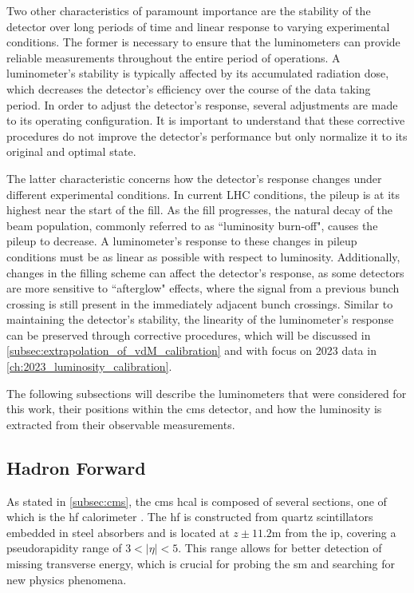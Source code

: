 Two other characteristics of paramount importance are the stability of the detector over long periods of time and linear response to varying experimental conditions. The former is necessary to ensure that the luminometers can provide reliable measurements throughout the entire period of operations. A luminometer’s stability is typically affected by its accumulated radiation dose, which decreases the detector’s efficiency over the course of the data taking period. In order to adjust the detector’s response, several adjustments are made to its operating configuration. It is important to understand that these corrective procedures do not improve the detector's performance but only normalize it to its original and optimal state.

The latter characteristic concerns how the detector’s response changes under different experimental conditions. In current LHC conditions, the pileup is at its highest near the start of the fill. As the fill progresses, the natural decay of the beam population, commonly referred to as ``luminosity burn-off", causes the pileup to decrease. A luminometer’s response to these changes in pileup conditions must be as linear as possible with respect to luminosity. Additionally, changes in the filling scheme can affect the detector’s response, as some detectors are more sensitive to ``afterglow" effects, where the signal from a previous bunch crossing is still present in the immediately adjacent bunch crossings. Similar to maintaining the detector's stability, the linearity of the luminometer’s response can be preserved through corrective procedures, which will be discussed in \autoref{subsec:extrapolation_of_vdM_calibration} and with focus on 2023 data in \autoref{ch:2023_luminosity_calibration}.

The following subsections will describe the luminometers that were considered for this work, their positions within the \acrshort{cms} detector, and how the luminosity is extracted from their observable measurements.

\subsection{Hadron Forward}

As stated in \autoref{subsec:cms}, the \acrshort{cms} \acrshort{hcal} is composed of several sections, one of which is the \acrfull{hf} calorimeter \cite{CMS:2012tda}. The \acrshort{hf} is constructed from quartz scintillators embedded in steel absorbers and is located at $z \pm 11.2$m from the \acrshort{ip}, covering a pseudorapidity range of $3 < |\eta| < 5$. This range allows for better detection of missing transverse energy, which is crucial for probing the \acrshort{sm} and searching for new physics phenomena.

